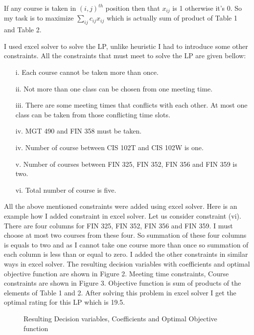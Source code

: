\documentclass[paper=letter, fontsize=11pt]{scrartcl} %
\begin{document}
If any course is taken in $(i,j)^{th}$ position then that  $x_{ij}$ is 1 otherwise it's 0. So my task is to maximize $\sum\limits_{ij} c_{ij}x_{ij}$ which is actually sum of product of Table 1 and Table 2.

I used excel solver to solve the LP, unlike heuristic I had to introduce some other constraints. All the constraints that must meet to solve the LP are given bellow:

\begin{enumerate}[align=left,style=nextline,leftmargin=1.5cm,labelsep=\parindent,font=\normalfont]
\item[i.]  Each course cannot be taken more than once.
\item[ii.] Not more than one class can be chosen from one meeting time.
\item[iii.] There are some meeting times that conflicts with each other. At most one class can be taken from those conflicting time slots.  
\item[iv.] MGT 490 and FIN 358 must be taken.
\item[iv.] Number of course between CIS 102T and CIS 102W is one.
\item[v.] Number of courses between FIN 325, FIN 352, FIN 356 and FIN 359 is two.
\item[vi.] Total number of course is five.
\end{enumerate}  

All the above mentioned constraints were added using excel solver. Here is an example how I added constraint in excel solver. Let us consider constraint (vi). There are four columns for FIN 325, FIN 352, FIN 356 and FIN 359. I must choose at most two courses from these four. So summation of these four columns is equals to two and as I cannot take one course more than once so summation of each column is less than or equal to zero. I added the other constraints in similar ways in excel solver.  The resulting decision variables with coefficients and optimal objective function are shown in Figure 2. Meeting time constraints, Course constraints are shown in Figure 3. Objective function is sum of products of the elements of Table 1 and 2. After solving this problem in excel solver I get the optimal rating for this LP which is 19.5.         
\begin{figure}[H]
  
  \centering
    \caption{Resulting Decision variables, Coefficients and Optimal Objective function}
\end{figure}
\end{document}
